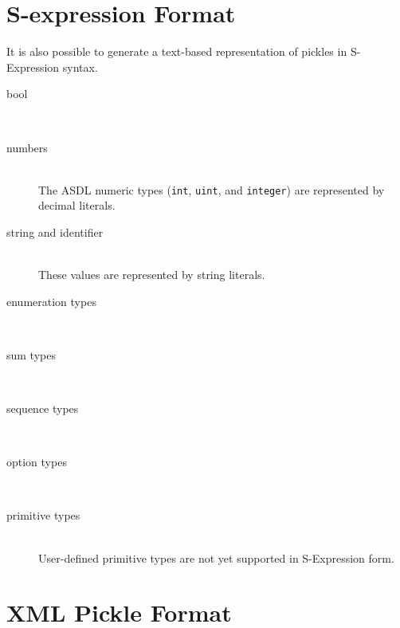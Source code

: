 \section{S-expression Format}
It is also possible to generate a text-based representation of pickles in S-Expression
syntax.

\begin{description}
  \item[bool] \mbox{}\\

  \item[numbers] \mbox{}\\
    The ASDL numeric types (\lstinline!int!, \lstinline!uint!, and \lstinline!integer!)
    are represented by decimal literals.

  \item[string and identifier] \mbox{}\\
    These values are represented by string literals.

  \item[enumeration types] \mbox{}\\
    
  \item[sum types] \mbox{}\\

  \item[sequence types] \mbox{}\\

  \item[option types] \mbox{}\\

  \item[primitive types] \mbox{}\\
    User-defined primitive types are not yet supported in S-Expression form.
    
\end{description}%

\section{XML Pickle Format}

